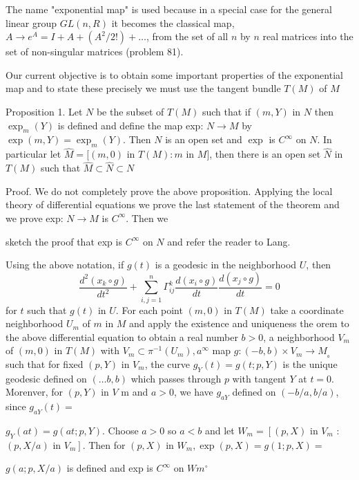 \documentclass[10pt]{article}
\begin{document}
The name "exponential map" is used because in a special case for the general linear group $G L(n, R)$ it becomes the classical map, $A \rightarrow e^{A}=I+A+\left(A^{2} / 2 !\right)+\ldots$, from the set of all $n$ by $n$ real matrices into the set of non-singular matrices (problem 81).

Our current objective is to obtain some important properties of the exponential map and to state these precisely we must use the tangent bundle $T(M)$ of $M$

Proposition 1. Let $N$ be the subset of $T(M)$ such that if $(m, Y)$ in $N$ then $\exp _{m}(Y)$ is defined and define the map exp: $N \rightarrow M$ by $\exp (m, Y)=\exp _{m}(Y) .$ Then $N$ is an open set and $\exp$ is $C^{\infty}$ on $N .$ In particular let $\hat{M}=[(m, 0)$ in $T(M): m$ in $M]$, then there is an open set $\widehat{N}$ in $T(M)$ such that $\hat{M} \subset \widehat{N} \subset N$

Proof. We do not completely prove the above proposition. Applying the local theory of differential equations we prove the last statement of the theorem and we prove exp: $N \rightarrow M$ is $C^{\infty}$. Then we

sketch the proof that exp is $C^{\infty}$ on $N$ and refer the reader to Lang.

Using the above notation, if $g(t)$ is a geodesic in the neighborhood $U$, then
$$
\frac{d^{2}\left(x_{k} \circ g\right)}{d t^{2}}+\sum_{i, j=1}^{n} \Gamma_{i j}^{k} \frac{d\left(x_{i} \circ g\right)}{d t} \frac{d\left(x_{j} \circ g\right)}{d t}=0
$$
for $t$ such that $g(t)$ in $U$. For each point $(m, 0)$ in $T(M)$ take a coordinate neighborhood $U_{m}$ of $m$ in $M$ and apply the existence and uniqueness the orem to the above differential equation to obtain a real number $b>0$, a neighborhood $V_{m}$ of $(m, 0)$ in $T(M)$ with $V_{m} \subset \pi^{-1}\left(U_{m}\right), a^{\infty}$ map $g:(-b, b) \times V_{m} \rightarrow M_{\text {。 }}$ such that for fixed $(p, Y)$ in $V_{m}$, the curve $g_{Y}(t)=g(t ; p, Y)$ is the unique geodesic defined on $(\ldots b, b)$ which passes through $p$ with tangent $Y$ at $t=0$. Morenver, for $(p, Y)$ in $V$ m and $a>0$, we have $g_{a Y}$ defined on $(-b / a, b / a)$, since $g_{a Y}(t)=$

$g_{Y}(a t)=g(a t ; p, Y) .$ Choose $a>0$ so $a<b$ and let $W_{m}=\left[(p, X)\right.$ in $V_{m}$ : $(p, X / a)$ in $\left.V_{m}\right]$. Then for $(p, X)$ in $W_{m}, \exp (p, X)=g(1 ; p, X)=$

$g(a ; p, X / a)$ is defined and exp is $C^{\infty}$ on $W m^{\circ}$
\end{document}
